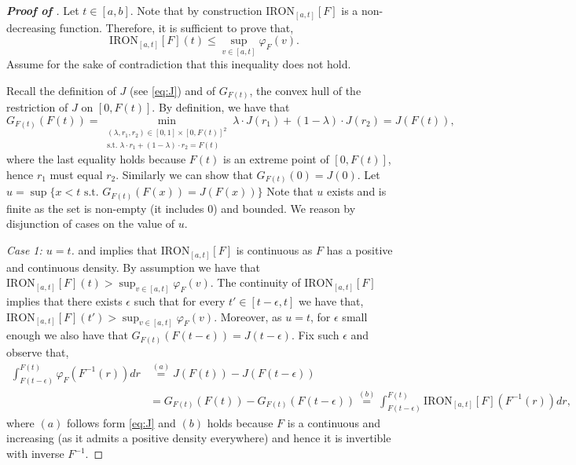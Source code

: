 \begin{proof}[\textbf{Proof of }]
    Let $t \in [a,b]$.
    Note that by construction $\mathrm{IRON}_{[a,t]}[F]$ is a non-decreasing function. Therefore, it is sufficient to prove that, 
    \begin{equation}
    \label{eq:ineq_to_prove}
    \mathrm{IRON}_{[a,t]}[F](t) \leq \sup_{v \in [a,t]} \varphi_{F}(v). 
    \end{equation}
    Assume for the sake of contradiction that this inequality does not hold.

    Recall the definition of $J$ (see \eqref{eq:J}) and of $G_{F(t)}$, the convex hull of the restriction of $J$ on $[0,F(t)]$.
    By definition, we have that
    \begin{equation*}
        G_{F(t)}(F(t)) = \min_{ \substack{(\lambda,r_1,r_2) \in [0,1]\times[0,F(t)]^2\\ \text{s.t. } \lambda \cdot r_1 + (1-\lambda) \cdot r_2 = F(t)} } \lambda \cdot J(r_1) + (1-\lambda) \cdot J(r_2) = J(F(t)),
    \end{equation*}
    where the last equality holds because $F(t)$ is an extreme point of $[0,F(t)]$, hence $r_1$ must equal $r_2$. Similarly we can show that $G_{F(t)}(0) = J(0).$ Let $u = \sup \{ x < t \text{ s.t. } G_{F(t)}(F(x)) = J(F(x)) \}$ Note that $u$ exists and is finite as the set is non-empty (it includes $0$) and bounded. We reason by disjunction of cases on the value of $u$.

    \textit{Case 1: $u = t$.}  and  implies that $\mathrm{IRON}_{[a,t]}[F]$ is continuous as $F$ has a positive and continuous density. By assumption we have that $\mathrm{IRON}_{[a,t]}[F](t) > \sup_{v \in [a,t]} \varphi_{F}(v)$. The continuity of $\mathrm{IRON}_{[a,t]}[F]$  implies that there exists $\epsilon$ such that for every $t' \in [t-\epsilon,t]$ we have that, $\mathrm{IRON}_{[a,t]}[F](t') > \sup_{v \in [a,t]} \varphi_{F}(v)$. Moreover, as $u = t$, for $\epsilon$ small enough we also have that $G_{F(t)}(F(t-\epsilon)) = J(t-\epsilon)$. Fix such $\epsilon$ and observe that,
    \begin{align*}
        \int_{F(t-\epsilon)}^{F(t)} \varphi_F(F^{-1}(r)) dr &\stackrel{(a)}{=} J(F(t)) -  J(F(t - \epsilon))\\
        &= G_{F(t)}(F(t)) - G_{F(t)} (F(t-\epsilon)) \stackrel{(b)}{=} \int_{F(t-\epsilon)}^{F(t)}  \mathrm{IRON}_{[a,t]}[F](F^{-1}(r)) dr,
    \end{align*}
    where $(a)$ follows form \eqref{eq:J} and $(b)$ holds because $F$ is a continuous and increasing (as it admits a positive density everywhere) and hence it is invertible with inverse $F^{-1}.$
    

\end{proof}
